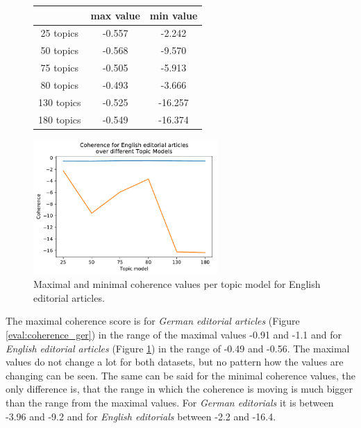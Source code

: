 \begin{figure}
	\begin{minipage}[t]{0.5\textwidth}
		\centering
		\begin{tabular}{c|cc}
			&max value & min value\\
			\hline
			25 topics&-0.557&-2.242\\
			50 topics&-0.568&-9.570\\
			75 topics&-0.505&-5.913\\
			80 topics&	-0.493&-3.666\\
			130 topics &-0.525&-16.257\\
			180 topics&	-0.549&-16.374\\
		\end{tabular}
	\end{minipage}%
	\begin{minipage}{0.5\textwidth}
		\centering
		\includegraphics[width=7cm]{gfx/Eval_IC/English_Editorial_Coherence.pdf}
	\end{minipage}
	\caption[]{Maximal and minimal coherence values per topic model for English editorial articles.}
	\label{eval:coherence_en}
\end{figure}
The maximal coherence score is for \textit{German editorial articles} (Figure \ref{eval:coherence_ger}) in the range of the maximal values -0.91 and -1.1 and for \textit{English editorial articles} (Figure \ref{eval:coherence_en}) in the range of -0.49 and -0.56. The maximal values do not change a lot for both datasets, but no pattern how the values are changing can be seen. The same can be said for the minimal coherence values, the only difference is, that the range in which the coherence is moving is much bigger than the range from the maximal values. For \textit{German editorials} it is between -3.96 and -9.2 and for \textit{English editorials} between -2.2 and -16.4.

